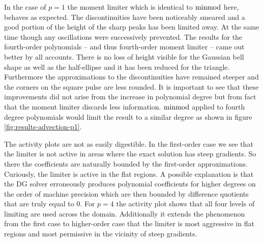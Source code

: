 In the case of $p = 1$ the moment limiter which is identical to $\operatorname{minmod}$ here, behaves as expected.
The discontinuities have been noticeably smeared and a good portion of the height of the sharp peaks has been limited away.
At the same time though any oscillations were successively prevented.
The results for the fourth-order polynomials -- and thus fourth-order moment limiter -- came out better by all accounts.
There is no loss of height visible for the Gaussian bell shape as well as the half-ellipse and it has been reduced for the triangle.
Furthermore the approximations to the discontinuities have remained steeper and the corners on the square pulse are less rounded.
It is important to see that these improvements did not arise from the increase in polynomial degree but from fact that the moment limiter discards less information.
$\operatorname{minmod}$ applied to fourth degree polynomials would limit the result to a similar degree as shown in figure \ref{fig:results-advection-p1}.

The activity plots are not as easily digestible.
In the first-order case we see that the limiter is not active in areas where the exact solution has steep gradients.
So there the coefficients are naturally bounded by the first-order approximations.
Curiously, the limiter is active in the flat regions.
A possible explanation is that the DG solver erroneously produces polynomial coefficients for higher degrees on the order of machine precision which are then bounded by difference quotients that are truly equal to $0$.
For $p = 4$ the activity plot shows that all four levels of limiting are used across the domain.
Additionally it extends the phenomenon from the first case to higher-order case that the limiter is most aggressive in flat regions and most permissive in the vicinity of steep gradients.
